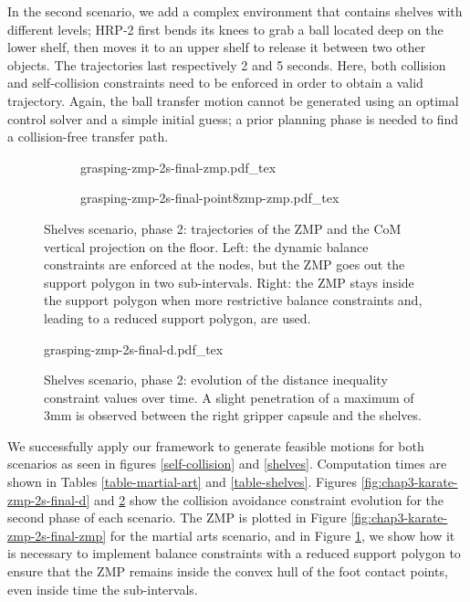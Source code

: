 In the second scenario, we add a complex environment that contains
shelves with different levels; HRP-2 first bends its knees to grab a
ball located deep on the lower shelf, then moves it to an upper shelf
to release it between two other objects. The trajectories last
respectively 2 and 5 seconds. Here, both collision and self-collision
constraints need to be enforced in order to obtain a valid
trajectory. Again, the ball transfer motion cannot be generated using
an optimal control solver and a simple initial guess; a prior planning
phase is needed to find a collision-free transfer path.

\begin{figure}
  \centering
  \begin{subfigure}{0.49\linewidth}
    \centering
        {\def\svgwidth{\linewidth}
          {\tiny
            
                       {grasping-zmp-2s-final-zmp.pdf_tex}
          }
        }
  \end{subfigure}
  \begin{subfigure}{0.49\linewidth}
    \centering
        {\def\svgwidth{\linewidth}
          {\tiny
            
                       {grasping-zmp-2s-final-point8zmp-zmp.pdf_tex}
          }
        }
  \end{subfigure}
  \caption{Shelves scenario, phase 2: trajectories of the ZMP and the
    CoM vertical projection on the floor. Left: the dynamic balance
    constraints are enforced at the nodes, but the ZMP goes out the
    support polygon in two sub-intervals. Right: the ZMP stays inside
    the support polygon when more restrictive balance constraints and,
    leading to a reduced support polygon, are used.}
  \label{fig:chap3-grasping-zmp-2s-final-zmp}
\end{figure}

\begin{figure}
  \centering
      {\def\svgwidth{0.8\linewidth}
        {\scriptsize
          
                     {grasping-zmp-2s-final-d.pdf_tex}
        }
      }
  \caption{Shelves scenario, phase 2: evolution of the distance
    inequality constraint values over time. A slight penetration of a
    maximum of 3mm is observed between the right gripper capsule and
    the shelves.}
  \label{fig:chap3-grasping-zmp-2s-final-d}
\end{figure}

We successfully apply our framework to generate feasible motions for
both scenarios as seen in figures \ref{self-collision} and
\ref{shelves}. Computation times are shown in Tables
\ref{table-martial-art} and \ref{table-shelves}. Figures
\ref{fig:chap3-karate-zmp-2s-final-d} and
\ref{fig:chap3-grasping-zmp-2s-final-d} show the collision avoidance
constraint evolution for the second phase of each scenario. The ZMP is
plotted in Figure \ref{fig:chap3-karate-zmp-2s-final-zmp} for the
martial arts scenario, and in Figure
\ref{fig:chap3-grasping-zmp-2s-final-zmp}, we show how it is necessary
to implement balance constraints with a reduced support polygon to
ensure that the ZMP remains inside the convex hull of the foot contact
points, even inside time the sub-intervals.

